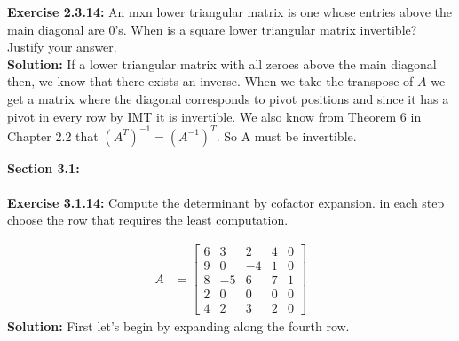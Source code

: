 \documentclass{amsart}
\begin{document}
\noindent\textbf{Exercise 2.3.14: } An mxn lower triangular matrix is one whose entries above the main diagonal are 0's. When is a square lower triangular matrix invertible? Justify your answer.\\
\noindent \textbf{Solution: } If a lower triangular matrix with all zeroes above the main diagonal then, we know that there exists an inverse. When we take the transpose of $A$ we get a matrix where the diagonal corresponds to pivot positions and since it has a pivot in every row by IMT it is invertible. We also know from Theorem 6 in Chapter 2.2 that $(A^{T})^{-1} = (A^{-1})^{T}$. So A must be invertible.
\vspace{1in}







{\huge\textbf{Section 3.1:}}\\\\
\noindent\textbf{Exercise 3.1.14: } Compute the determinant by cofactor expansion. in each step choose the row that requires the least computation.

\begin{align*}
A &= 
\begin{bmatrix}
  6&3   &2  &4  &0\\
  9&0   &-4  &1  &0 \\
 8 & -5  &6  &7  &1 \\
  2  &0   &0  &0 &0 \\
  4&2&3&2&0   
\end{bmatrix}
\end{align*}
\noindent \textbf{Solution: } First let's begin by expanding along the fourth row.
\end{document}
